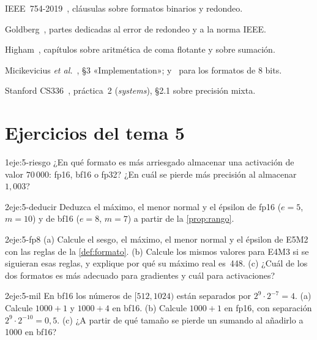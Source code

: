 \begin{lecturas}
\item IEEE~754-2019~\cite{ieee754}, cláusulas sobre formatos binarios y redondeo.
\item Goldberg~\cite{goldberg}, partes dedicadas al error de redondeo y a la norma IEEE.
\item Higham~\cite{higham}, capítulos sobre aritmética de coma flotante y sobre sumación.
\item Micikevicius \emph{et al.}~\cite{micikevicius}, §3 «Implementation»; y~\cite{fp8} para los formatos de 8 bits.
\item Stanford CS336~\cite{cs336b}, práctica~2 (\emph{systems}), §2.1 sobre precisión mixta.
\end{lecturas}

\section*{Ejercicios del tema 5}

\begin{ejercicio}{1}{eje:5-riesgo}
¿En qué formato es más arriesgado almacenar una activación de valor $70\,000$: fp16, bf16 o fp32? ¿En cuál se pierde más precisión al almacenar $1{,}003$?
\end{ejercicio}

\begin{ejercicio}{2}{eje:5-deducir}
Deduzca el máximo, el menor normal y el épsilon de fp16 ($e=5$, $m=10$) y de bf16 ($e=8$, $m=7$) a partir de la \cref{prop:rango}.
\end{ejercicio}

\begin{ejercicio}{2}{eje:5-fp8}
(a) Calcule el sesgo, el máximo, el menor normal y el épsilon de E5M2 con las reglas de la \cref{def:formato}. (b) Calcule los mismos valores para E4M3 si se siguieran esas reglas, y explique por qué su máximo real es~448. (c) ¿Cuál de los dos formatos es más adecuado para gradientes y cuál para activaciones?
\end{ejercicio}

\begin{ejercicio}{2}{eje:5-mil}
En bf16 los números de $[512,1024)$ están separados por $2^{9}\cdot 2^{-7}=4$. (a) Calcule $1000+1$ y $1000+4$ en bf16. (b) Calcule $1000+1$ en fp16, con separación $2^{9}\cdot 2^{-10}=0{,}5$. (c) ¿A partir de qué tamaño se pierde un sumando al añadirlo a 1000 en bf16?
\end{ejercicio}

